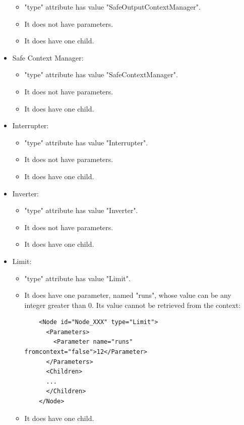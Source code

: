 \documentclass[a4paper,10pt]{article}
\begin{document}
\begin{itemize}
  \begin{itemize}
  \item "type" attribute has value "SafeOutputContextManager".
  \item It does not have parameters.
  \item It does have one child.
  \end{itemize}

\item Safe Context Manager:

  \begin{itemize}
  \item "type" attribute has value "SafeContextManager".
  \item It does not have parameters.
  \item It does have one child.
  \end{itemize}

\item Interrupter:

  \begin{itemize}
  \item "type" attribute has value "Interrupter".
  \item It does not have parameters.
  \item It does have one child.
  \end{itemize}

\item Inverter:

  \begin{itemize}
  \item "type" attribute has value "Inverter".
  \item It does not have parameters.
  \item It does have one child.
  \end{itemize}

\item Limit:

  \begin{itemize}
  \item "type" attribute has value "Limit".
  \item It does have one parameter, named "runs", whose value can be any integer greater than 0. Its value cannot be retrieved from the context:
    \begin{verbatim}
    <Node id="Node_XXX" type="Limit">
      <Parameters>
        <Parameter name="runs" fromcontext="false">12</Parameter>
      </Parameters>
      <Children>
      ...
      </Children>
    </Node>
    \end{verbatim}
  \item It does have one child.
  \end{itemize}


\end{itemize}
\end{document}
